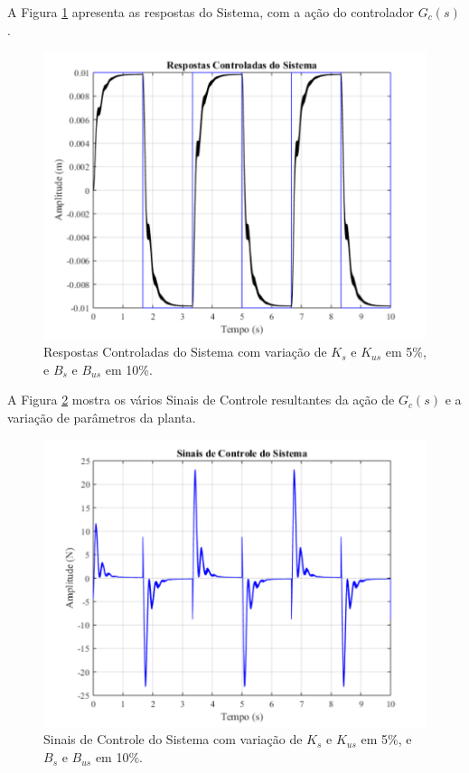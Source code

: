 \documentclass[journal,brazil,english]{IEEEtran}
\begin{document}
A Figura \ref{controladaIntervalar2} apresenta as respostas do Sistema, com a ação do controlador $G_c(s)$.
\begin{figure}[H]
	\centering
\includegraphics[width=\columnwidth]{./imagens/resposta_controlada_variando_Ks_Kus_5_Bs_Bus_10_controlador_sem_robustez.pdf}
    \renewcommand{\figurename}{Fig.}
    \caption{Respostas Controladas do Sistema com variação de $K_s$ e $K_{us}$ em 5\%, e $B_s$ e $B_{us}$ em 10\%.}
	\label{controladaIntervalar2}
\end{figure}

A Figura \ref{sinalcontroleIntervalar2} mostra os vários Sinais de Controle resultantes da ação de $G_c(s)$ e a variação de parâmetros da planta.
\begin{figure}[H]
	\centering
\includegraphics[width=\columnwidth]{./imagens/sinal_de_controle_variando_Ks_Kus_5_Bs_Bus_10_controlador_sem_robustez.pdf}
    \renewcommand{\figurename}{Fig.}
    \caption{Sinais de Controle do Sistema com variação de $K_s$ e $K_{us}$ em 5\%, e $B_s$ e $B_{us}$ em 10\%.}
	\label{sinalcontroleIntervalar2}
\end{figure}
\end{document}
